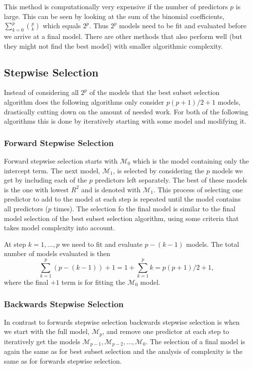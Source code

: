 \documentclass[a4paper, 12pt]{scrartcl}
\begin{document}
This method is computationally very expensive if the number of predictors $p$ is large. This can be seen by looking at the sum of the binomial coefficients, $\sum_{k=0}^{p}{p \choose k}$ which equals $2^p$. Thus $2^p$ models need to be fit and evaluated before we arrive at a final model. There are other methods that also perform well (but they might not find the best model) with smaller algorithmic complexity.

\subsection{Stepwise Selection}
Instead of considering all $2^p$ of the models that the best subset selection  algorithm does the following algorithms only consider $p(p+1)/2+1$ models, drastically cutting down on the amount of needed work. For both of the following algorithms this is done by iteratively starting with some model and modifying it.

\begin{mdframed}[backgroundcolor=Goldenrod, linecolor=White]
\subsubsection{Forward Stepwise Selection}
Forward stepwise selection starts with $\mathcal{M}_0$ which is the model containing only the intercept term. The next model, $\mathcal{M}_1$, is selected by considering the $p$ models we get by including each of the $p$ predictors left separately. The best of these models is the one with lowest $R^2$ and is denoted with $\mathcal{M}_1$. This process of selecting one predictor to add to the model at each step is repeated until the model contains all predictors ($p$ times). The selection fo the final model is similar to the final model selection of the best subset selection algorithm, using some criteria that takes model complexity into account.

At step $k=1,\ldots,p$ we need to fit and evaluate $p-(k-1)$ models. The total number of models evaluated is then
\begin{equation*}
\sum_{k=1}^{p} \left(p-(k-1)\right) + 1=1+\sum_{k=1}^{p} k = p(p+1)/2+1,
\end{equation*}
where the final $+1$ term is for fitting the $\mathcal{M}_0$ model.
\end{mdframed}

\begin{mdframed}[backgroundcolor=Goldenrod, linecolor=White]
\subsubsection{Backwards Stepwise Selection}
In contrast to forwards stepwise selection backwards stepwise selection is when we start with the full model, $\mathcal{M}_p$, and remove one predictor at each step to iteratively get the models $\mathcal{M}_{p-1},\mathcal{M}_{p-2},\ldots,\mathcal{M}_0$. The selection of a final model is again the same as for best subset selection and the analysis of complexity is the same as for forwards stepwise selection.
\end{mdframed}
\end{document}
